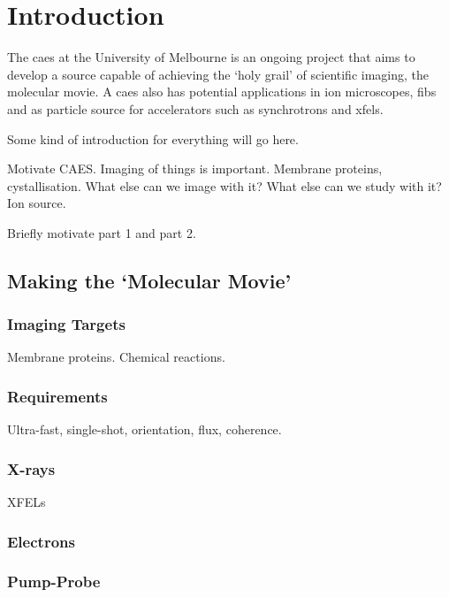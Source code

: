  \chapter{Introduction}
 
\setcounter{page}{1}

The \gls{caes} at the University of Melbourne is an ongoing project that aims to develop a source capable of achieving the `holy grail' of scientific imaging, the molecular movie\cite{dwyer_femtosecond_2006}.
A \gls{caes} also has potential applications in ion microscopes, \glspl{fib} and as particle source for accelerators such as synchrotrons and \glspl{xfel}.

{\color{red}
Some kind of introduction for everything will go here.

Motivate CAES. Imaging of things is important. Membrane proteins, cystallisation. What else can we image with it? What else can we study with it? Ion source.

Briefly motivate part 1 and part 2.}

\section{Making the `Molecular Movie'}

\subsection{Imaging Targets}

Membrane proteins.
Chemical reactions.


\subsection{Requirements}

Ultra-fast, single-shot, orientation, flux, coherence.

\subsection{X-rays}

XFELs

\subsection{Electrons}

\subsection{Pump-Probe}

